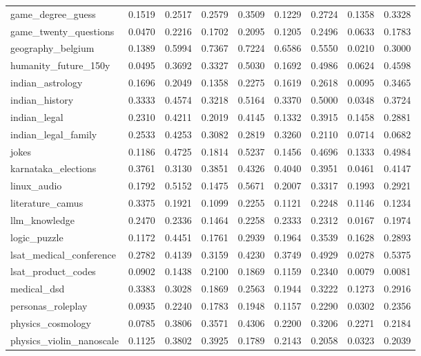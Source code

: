 \begin{landscape}
\begin{longtable}{@{}p{3.8cm}cccccccc@{}}
game\_degree\_guess & 0.1519 & 0.2517 & 0.2579 & 0.3509 & 0.1229 & 0.2724 & 0.1358 & 0.3328 \\
game\_twenty\_questions & 0.0470 & 0.2216 & 0.1702 & 0.2095 & 0.1205 & 0.2496 & 0.0633 & 0.1783 \\
geography\_belgium & 0.1389 & 0.5994 & 0.7367 & 0.7224 & 0.6586 & 0.5550 & 0.0210 & 0.3000 \\
humanity\_future\_150y & 0.0495 & 0.3692 & 0.3327 & 0.5030 & 0.1692 & 0.4986 & 0.0624 & 0.4598 \\
indian\_astrology & 0.1696 & 0.2049 & 0.1358 & 0.2275 & 0.1619 & 0.2618 & 0.0095 & 0.3465 \\
indian\_history & 0.3333 & 0.4574 & 0.3218 & 0.5164 & 0.3370 & 0.5000 & 0.0348 & 0.3724 \\
indian\_legal & 0.2310 & 0.4211 & 0.2019 & 0.4145 & 0.1332 & 0.3915 & 0.1458 & 0.2881 \\
indian\_legal\_family & 0.2533 & 0.4253 & 0.3082 & 0.2819 & 0.3260 & 0.2110 & 0.0714 & 0.0682 \\
jokes & 0.1186 & 0.4725 & 0.1814 & 0.5237 & 0.1456 & 0.4696 & 0.1333 & 0.4984 \\
karnataka\_elections & 0.3761 & 0.3130 & 0.3851 & 0.4326 & 0.4040 & 0.3951 & 0.0461 & 0.4147 \\
linux\_audio & 0.1792 & 0.5152 & 0.1475 & 0.5671 & 0.2007 & 0.3317 & 0.1993 & 0.2921 \\
literature\_camus & 0.3375 & 0.1921 & 0.1099 & 0.2255 & 0.1121 & 0.2248 & 0.1146 & 0.1234 \\
llm\_knowledge & 0.2470 & 0.2336 & 0.1464 & 0.2258 & 0.2333 & 0.2312 & 0.0167 & 0.1974 \\
logic\_puzzle & 0.1172 & 0.4451 & 0.1761 & 0.2939 & 0.1964 & 0.3539 & 0.1628 & 0.2893 \\
lsat\_medical\_conference & 0.2782 & 0.4139 & 0.3159 & 0.4230 & 0.3749 & 0.4929 & 0.0278 & 0.5375 \\
lsat\_product\_codes & 0.0902 & 0.1438 & 0.2100 & 0.1869 & 0.1159 & 0.2340 & 0.0079 & 0.0081 \\
medical\_dsd & 0.3383 & 0.3028 & 0.1869 & 0.2563 & 0.1944 & 0.3222 & 0.1273 & 0.2916 \\
personas\_roleplay & 0.0935 & 0.2240 & 0.1783 & 0.1948 & 0.1157 & 0.2290 & 0.0302 & 0.2356 \\
physics\_cosmology & 0.0785 & 0.3806 & 0.3571 & 0.4306 & 0.2200 & 0.3206 & 0.2271 & 0.2184 \\
physics\_violin\_nanoscale & 0.1125 & 0.3802 & 0.3925 & 0.1789 & 0.2143 & 0.2058 & 0.0323 & 0.2039 \\

\end{longtable}
\end{landscape}

